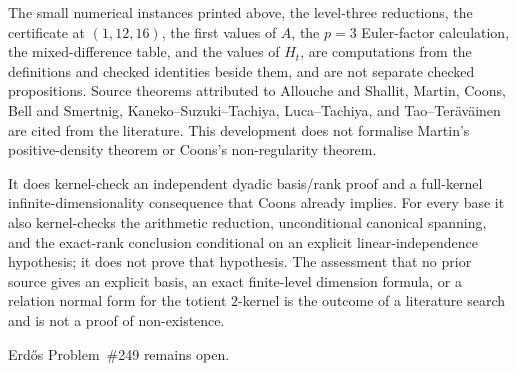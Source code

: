 \documentclass[11pt]{article}
\newcommand{\Aw}{A}
\begin{document}
The small numerical
instances printed above, the level-three reductions, the certificate at
$(1,12,16)$, the first values of $\Aw$, the $p=3$ Euler-factor calculation,
the mixed-difference table, and the values of $H_t$, are computations from
the definitions and checked identities beside them, and are not separate
checked propositions.  Source theorems attributed to Allouche and Shallit,
Martin, Coons, Bell and Smertnig, Kaneko--Suzuki--Tachiya, Luca--Tachiya, and
Tao--Ter\"av\"ainen are cited from the literature.  This development does not
formalise Martin's positive-density theorem or Coons's non-regularity theorem.

It does kernel-check an independent dyadic basis/rank proof and a full-kernel
infinite-dimensionality consequence that Coons already implies.  For every
base it also kernel-checks the arithmetic reduction, unconditional canonical
spanning, and the exact-rank conclusion conditional on an explicit
linear-independence hypothesis; it does not prove that hypothesis.  The
assessment that no prior source gives an explicit basis, an exact finite-level
dimension formula, or a relation normal form for the totient $2$-kernel is the
outcome of a literature search and is not a proof of non-existence.

Erd\H{o}s Problem~\#249 remains open.
\end{document}
